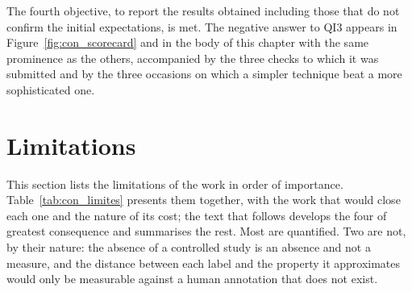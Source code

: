The fourth objective, to report the results obtained including those that do not confirm the
initial expectations, is met. The negative answer to \gls{QI}3 appears in
Figure~\ref{fig:con_scorecard} and in the body of this chapter with the same prominence as the
others, accompanied by the three checks to which it was submitted and by the three occasions on
which a simpler technique beat a more sophisticated one.

\section{Limitations}
\label{sec:con_limitacoes}

This section lists the limitations of the work in order of importance.
Table~\ref{tab:con_limites} presents them together, with the work that would close each one and the
nature of its cost; the text that follows develops the four of greatest consequence and summarises
the rest. Most are quantified. Two are not, by their nature: the absence of a controlled study is an
absence and not a measure, and the distance between each label and the property it approximates
would only be measurable against a human annotation that does not exist.

